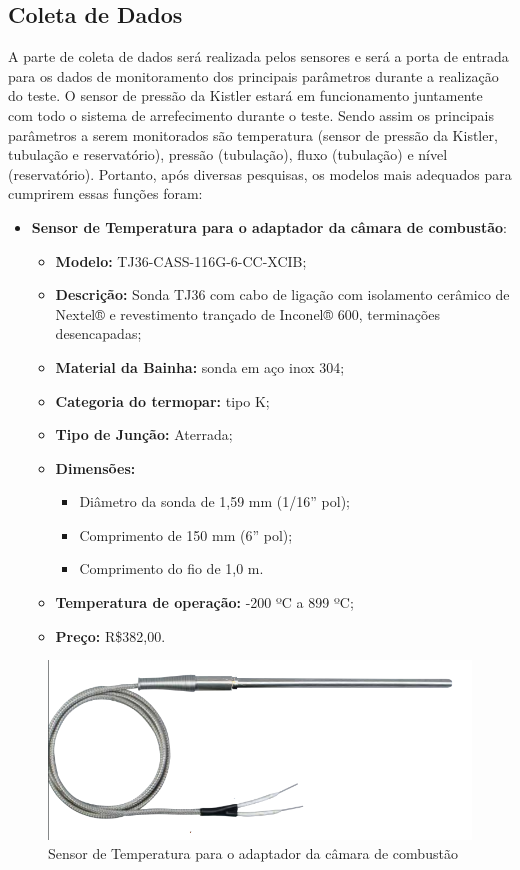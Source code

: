 \subsection{Coleta de Dados}
A parte de coleta de dados será realizada pelos sensores e será a porta de entrada para os dados de monitoramento dos principais parâmetros durante a realização do teste. O sensor de pressão da Kistler estará em funcionamento juntamente com todo o sistema de arrefecimento durante o teste. Sendo assim os principais parâmetros a serem monitorados são temperatura (sensor de pressão da Kistler, tubulação e reservatório), pressão (tubulação), fluxo (tubulação) e nível (reservatório). Portanto, após diversas pesquisas, os modelos mais adequados para cumprirem essas funções foram:
\begin{itemize}
	\item \textbf{Sensor de Temperatura para o adaptador da câmara de combustão}:
	\begin{itemize}
		\item \textbf{ Modelo:} TJ36-CASS-116G-6-CC-XCIB;
		\item \textbf{ Descrição:} Sonda TJ36 com cabo de ligação com isolamento cerâmico de Nextel® e revestimento trançado de Inconel® 600, terminações desencapadas;
		\item \textbf{ Material da Bainha:} sonda em aço inox 304;
		\item \textbf{ Categoria do termopar:} tipo K;
		\item \textbf{ Tipo de Junção:} Aterrada;
		\item \textbf{ Dimensões:}
		\begin{itemize}
			\item  Diâmetro da sonda de 1,59 mm (1/16” pol);
			\item Comprimento de 150 mm (6” pol);
			\item Comprimento do fio de 1,0 m.
		\end{itemize}
		\item \textbf{ Temperatura de operação:} -200 ºC a 899 ºC;
		\item \textbf{ Preço:} R\$382,00.
	\end{itemize}
	
\end{itemize}
\begin{figure}[!htb]                   
	\centering                          
	\includegraphics[scale=0.4]{figuras/Sensor1.png}
	\caption{Sensor de Temperatura para o adaptador da câmara de combustão}               
\end{figure}
